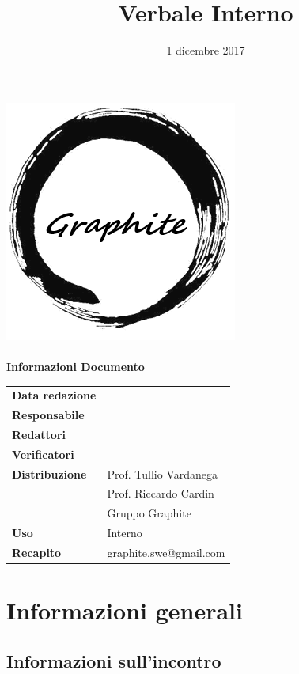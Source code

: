 \documentclass[openany,12pt,a4paper]{article}
\title{Verbale Interno}
\author{}
\date{1 dicembre 2017}
\begin{document}
	\makeatletter
	\begin{titlepage}
		\setlength{\headsep}{0pt}  
		\begin{center}
			\includegraphics[width=0.5\linewidth]{Logo.png}\\[1em]
			{\huge \bfseries  \@title }\\[10ex]
			\textbf{\Large Informazioni Documento} \\[2em]
			\bgroup
			\def\arraystretch{1.5}
			\begin{tabular}{l|l}
				\textbf{Data redazione} & \large \@date \\
				\textbf{Responsabile} &  \\
				\textbf{Redattori} &  \\
				\textbf{Verificatori} &  \\
				\textbf{Distribuzione} & Prof. Tullio Vardanega \\
				 & Prof. Riccardo Cardin \\
				 & Gruppo Graphite \\
				\textbf{Uso} & Interno \\
				\textbf{Recapito} & graphite.swe@gmail.com \\
			\end{tabular}
		\egroup
		\end{center}
	\end{titlepage}
	\makeatother

	\thispagestyle{empty}
	\newpage
	
	\tableofcontents
	\newpage
	
	\section{Informazioni generali}
	
	\subsection{Informazioni sull'incontro}
	
\end{document}
